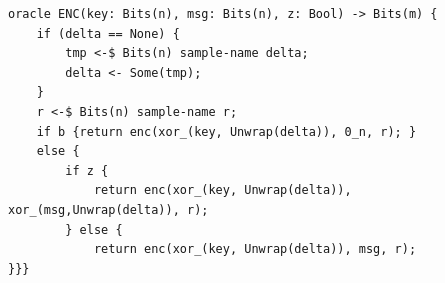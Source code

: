 \begin{longlisting}
\begin{verbatim}
oracle ENC(key: Bits(n), msg: Bits(n), z: Bool) -> Bits(m) {
    if (delta == None) {
        tmp <-$ Bits(n) sample-name delta;
        delta <- Some(tmp);
    } 
    r <-$ Bits(n) sample-name r;
    if b {return enc(xor_(key, Unwrap(delta)), 0_n, r); }
    else {
        if z {
            return enc(xor_(key, Unwrap(delta)), xor_(msg,Unwrap(delta)), r); 
        } else {
            return enc(xor_(key, Unwrap(delta)), msg, r);
}}}
\end{verbatim}
\caption{Oracle ENC in LINRKKDM.pkg.ssp}
\label{lst:freexor-pkg-linrkkdm-ora-ENC}
\end{longlisting}